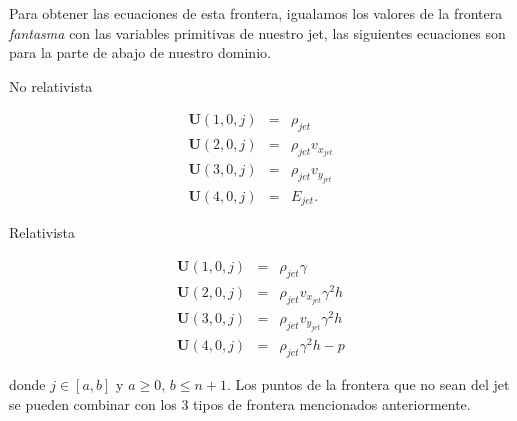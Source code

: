 \documentclass[12pt,a4paper]{book}
\begin{document}
Para obtener las ecuaciones de esta frontera, igualamos los valores de la frontera \emph{fantasma} con las variables primitivas de nuestro jet, las siguientes ecuaciones son para la parte de abajo de nuestro dominio.


No relativista

\begin{eqnarray}
\textbf{U}(1,0,j)&=&\rho_{jet} \\
\textbf{U}(2,0,j)&=& \rho_{jet} v_{x_{jet}}\\
\textbf{U}(3,0,j)&=& \rho_{jet} v_{y_{jet}}\\
\textbf{U}(4,0,j)&=& E_{jet}.
\end{eqnarray}

Relativista

\begin{eqnarray}
\textbf{U}(1,0,j)&=&\rho_{jet} \gamma \\
\textbf{U}(2,0,j)&=& \rho_{jet} v_{x_{jet}} \gamma^2 h \\
\textbf{U}(3,0,j)&=& \rho_{jet} v_{y_{jet}} \gamma^2 h \\
\textbf{U}(4,0,j)&=& \rho_{jet} \gamma^2 h-p
\end{eqnarray}

\noindent donde $j\in \left[ a,b \right]$ y $a\geq 0, \, b\leq n+1$. Los puntos de la frontera que no sean del jet se pueden combinar con los 3 tipos de frontera mencionados anteriormente.

\end{document}
